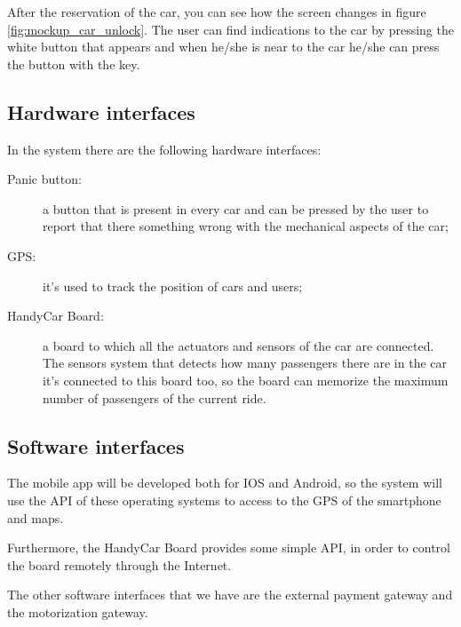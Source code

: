 After the reservation of the car, you can see how the screen changes in figure \ref{fig:mockup_car_unlock}. The user can find indications to the car by pressing the white button that appears and when he/she is near to the car he/she can press the button with the key.

\subsection{Hardware interfaces}
In the system there are the following hardware interfaces:
\begin{description}
	\item [Panic button:] a button that is present in every car and can be pressed by the user to report that there something wrong with the mechanical aspects of the car;
	\item [GPS:] it's used to track the position of cars and users;
	\item [HandyCar Board:] a board to which all the actuators and sensors of the car are connected. The sensors system that detects how many passengers there are in the car it's connected to this board too, so the board can memorize the maximum number of passengers of the current ride.
\end{description}

\subsection{Software interfaces}
The mobile app will be developed both for IOS and Android, so the system will use the API of these operating systems to access to the GPS of the smartphone and maps.

Furthermore, the HandyCar Board provides some simple API, in order to control the board remotely through the Internet.

The other software interfaces that we have are the external payment	gateway and the motorization gateway.




